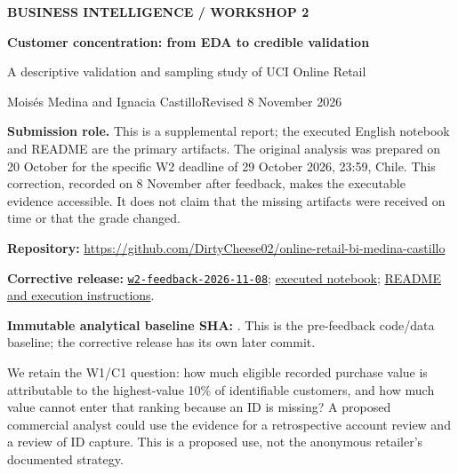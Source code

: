 \documentclass[10pt,a4paper]{article}
\newcommand{\sectionhead}[1]{\Needspace{8\baselineskip}\vspace{.4em}{\large\bfseries\color{navy}#1}\par\vspace{.1em}}
\begin{document}
\thispagestyle{empty}
{\small\bfseries\color{navy} BUSINESS INTELLIGENCE / WORKSHOP 2}\par\vspace{.6em}
{\LARGE\bfseries Customer concentration: from EDA to credible validation}\par\vspace{.35em}
{\large A descriptive validation and sampling study of UCI Online Retail}\par\vspace{.5em}
{\color{muted}Mois\'es Medina and Ignacia Castillo\hfill Revised 8 November 2026}\par
{}\vspace{.6em}
\textbf{Submission role.} This is a supplemental report; the executed English notebook and README are the primary artifacts. The original analysis was prepared on 20 October for the specific W2 deadline of 29 October 2026, 23:59, Chile. This correction, recorded on 8 November after feedback, makes the executable evidence accessible. It does not claim that the missing artifacts were received on time or that the grade changed.

{\small\textbf{Repository:} \url{https://github.com/DirtyCheese02/online-retail-bi-medina-castillo}\par\textbf{Corrective release:} \href{https://github.com/DirtyCheese02/online-retail-bi-medina-castillo/tree/w2-feedback-2026-11-08}{\texttt{w2-feedback-2026-11-08}}; \href{https://github.com/DirtyCheese02/online-retail-bi-medina-castillo/blob/w2-feedback-2026-11-08/notebooks/W2_project.ipynb}{executed notebook}; \href{https://github.com/DirtyCheese02/online-retail-bi-medina-castillo/blob/w2-feedback-2026-11-08/README.md}{README and execution instructions}.\par\textbf{Immutable analytical baseline SHA:} . This is the pre-feedback code/data baseline; the corrective release has its own later commit.}\par


\sectionhead{1\quad Continuity, decision and measurement}
We retain the W1/C1 question: how much eligible recorded purchase value is attributable to the highest-value 10\% of identifiable customers, and how much value cannot enter that ranking because an ID is missing? A proposed commercial analyst could use the evidence for a retrospective account review and a review of ID capture. This is a proposed use, not the anonymous retailer's documented strategy.
\end{document}

